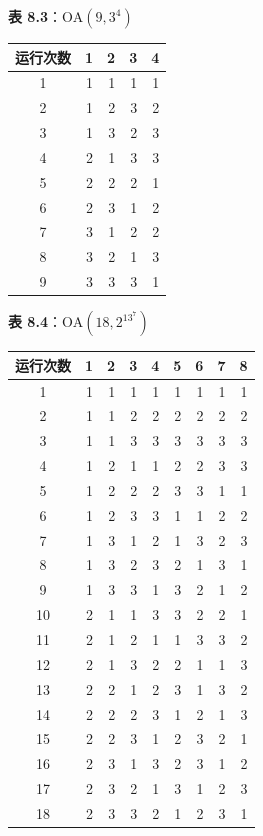 \documentclass{ctexart}
\begin{document}
\begin{mdquote}
\textbf{表 8.3}：$\mathrm{OA}(9,3^4)$
\end{mdquote}

\begin{table}[htbp]
\begin{tabular}{c|r|r|r|r}
\hline
运行次数 & 1 & 2 & 3 & 4 \\
\hline
1 & 1 & 1 & 1 & 1 \\
2 & 1 & 2 & 3 & 2 \\
3 & 1 & 3 & 2 & 3 \\
4 & 2 & 1 & 3 & 3 \\
5 & 2 & 2 & 2 & 1 \\
6 & 2 & 3 & 1 & 2 \\
7 & 3 & 1 & 2 & 2 \\
8 & 3 & 2 & 1 & 3 \\
9 & 3 & 3 & 3 & 1 \\
\hline
\end{tabular}
\end{table}

\begin{mdquote}
\textbf{表 8.4}：$\mathrm{OA}(18,2^13^7)$
\end{mdquote}

\begin{table}[htbp]
\begin{tabular}{c|r|r|r|r|r|r|r|r}
\hline
运行次数 & 1 & 2 & 3 & 4 & 5 & 6 & 7 & 8 \\
\hline
1 & 1 & 1 & 1 & 1 & 1 & 1 & 1 & 1 \\
2 & 1 & 1 & 2 & 2 & 2 & 2 & 2 & 2 \\
3 & 1 & 1 & 3 & 3 & 3 & 3 & 3 & 3 \\
4 & 1 & 2 & 1 & 1 & 2 & 2 & 3 & 3 \\
5 & 1 & 2 & 2 & 2 & 3 & 3 & 1 & 1 \\
6 & 1 & 2 & 3 & 3 & 1 & 1 & 2 & 2 \\
7 & 1 & 3 & 1 & 2 & 1 & 3 & 2 & 3 \\
8 & 1 & 3 & 2 & 3 & 2 & 1 & 3 & 1 \\
9 & 1 & 3 & 3 & 1 & 3 & 2 & 1 & 2 \\
10 & 2 & 1 & 1 & 3 & 3 & 2 & 2 & 1 \\
11 & 2 & 1 & 2 & 1 & 1 & 3 & 3 & 2 \\
12 & 2 & 1 & 3 & 2 & 2 & 1 & 1 & 3 \\
13 & 2 & 2 & 1 & 2 & 3 & 1 & 3 & 2 \\
14 & 2 & 2 & 2 & 3 & 1 & 2 & 1 & 3 \\
15 & 2 & 2 & 3 & 1 & 2 & 3 & 2 & 1 \\
16 & 2 & 3 & 1 & 3 & 2 & 3 & 1 & 2 \\
17 & 2 & 3 & 2 & 1 & 3 & 1 & 2 & 3 \\
18 & 2 & 3 & 3 & 2 & 1 & 2 & 3 & 1 \\
\hline
\end{tabular}
\end{table}
\end{document}
